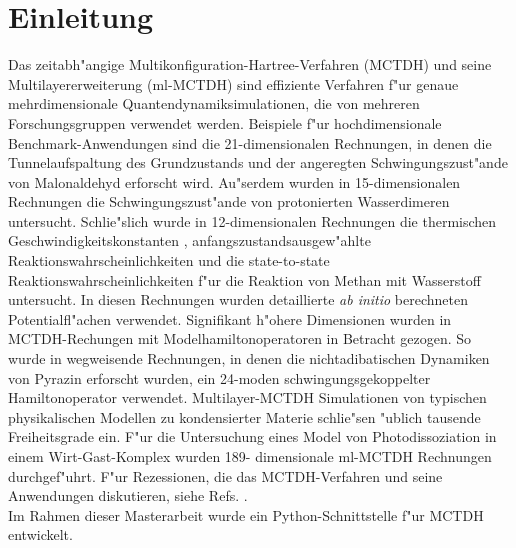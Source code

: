 \chapter{Einleitung}
\label{ch:einleitung}

Das zeitabh"angige Multikonfiguration-Hartree-Verfahren (MCTDH) 
\cite{MMC, MMC1} und seine Multilayererweiterung (ml-MCTDH)
\cite{WT3, Mreview2} 
sind effiziente Verfahren f"ur genaue mehrdimensionale Quantendynamiksimulationen,
die von mehreren Forschungsgruppen verwendet werden. 
\cite{MCTDHex1, WestPNM, MCTDHex2, W1, MCTDHex4, MCTDHex5, MCTDHex6, MCTDHex7, MCTDHex8,
MCTDHex9, MCTDHex10, MCTDHex11, MCTDHex12, MCTDHex13, MCTDHex14, MCTDHex15, MCTDHex16, MCTDHex17,MCTDHex18} 
Beispiele f"ur hochdimensionale 
Benchmark-Anwendungen sind die 21-dimensionalen Rechnungen, in denen die Tunnelaufspaltung des
Grundzustands \cite{CVM, HCVM, HaM1, MAMCTDH, HaM2, MAMCTDH2} und der angeregten \cite{HCVM, HaM1, MAMCTDH, HaM2, MAMCTDH2}
Schwingungszust"ande von Malonaldehyd erforscht wird. 
Au"serdem wurden in 15-dimen\-sio\-nalen Rechnungen die Schwingungszust"ande von protonierten 
Wasserdimeren \cite{H5O2+MCTDH, H5O2+MCTDH2, H5O2+MCTDH3, H5O2+MCTDH4, H5O2+MCTDH5} untersucht. 
Schlie"s\-lich wurde in 12-dimensionalen Rechnungen die thermischen 
Geschwindig\-keitskonstanten \cite{HM1, HM2, WWM, SM, vHNM,NvHM}, anfangszustandsausgew"ahlte Reaktionswahrscheinlichkeiten
\cite{SM02, SM04, WeM5, WeM6, WeM8} und die 
state-to-state Reaktionswahrscheinlichkeiten \cite{WeM7} f"ur die Reaktion von Methan mit Wasserstoff 
untersucht. In diesen Rechnungen wurden detaillierte \textit{ab initio} berechneten
Potentialfl"achen verwendet. Signifikant h"ohere Dimensionen wurden in MCTDH-Rechungen mit 
Modelhamiltonoperatoren in Betracht gezogen. So wurde in wegweisende Rechnungen, in denen  
die nichtadibatischen Dynamiken von Pyrazin erforscht wurden, ein 24-moden 
schwingungsgekoppelter Hamiltonoperator \cite{WMC, WMC2, RWMC} verwendet. Multilayer-MCTDH Simulationen von typischen
physikalischen Modellen \cite{WT3, W1, WST, KCBWT, CTW2, WPHT} zu kondensierter Materie schlie"sen "ublich tausende Freiheitsgrade ein.
F"ur die Untersuchung eines Model von Photodissoziation in einem Wirt-Gast-Komplex wurden 189-
dimensionale ml-MCTDH Rechnungen \cite{WBRSM} durchgef"uhrt. F"ur Rezessionen, die das MCTDH-Verfahren und
seine Anwendungen diskutieren, siehe Refs. \cite{MCTDHreview, MCTDHreview2, HMreview1, MCTDHbook,Mreview2011, MCTDHreview3}.
\\ Im Rahmen dieser Masterarbeit wurde ein Python-Schnittstelle f"ur MCTDH entwickelt.
